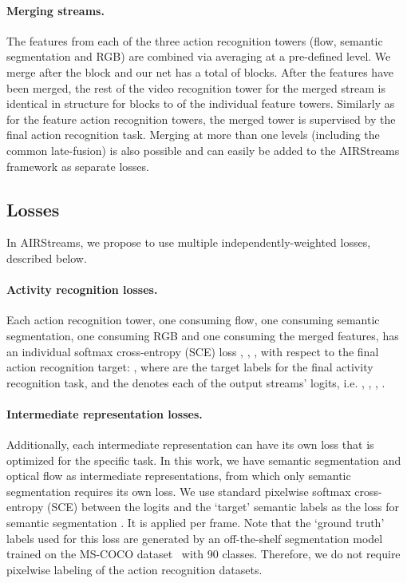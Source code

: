 \documentclass[final]{cvpr}
\begin{document}
\paragraph{Merging streams.} \label{sssection:merging}
The features from each of the three action recognition towers (flow, semantic segmentation and RGB) are combined via averaging at a pre-defined level. We merge after the  block and our net has a total of  blocks. After the features have been merged, the rest of the video recognition tower for the merged stream is identical in structure for blocks  to  of the individual feature towers. Similarly as for the feature action recognition towers, the merged tower is supervised by the final action recognition task.
Merging at more than one levels (including the common late-fusion) is also possible and can easily be added to the AIRStreams framework as separate losses.


\subsection{Losses} \label{ssection:losses}
\label{sec:losses}

In AIRStreams, we propose to use multiple independently-weighted losses, described below. 

\paragraph{Activity recognition losses.}
Each action recognition tower, one consuming flow, one consuming semantic segmentation, one consuming RGB and one consuming the merged features, has an individual softmax cross-entropy (SCE) loss , , ,  with respect to the final action recognition target:
, where  are the target labels for the final activity recognition task, and the  denotes each of the output streams' logits, i.e. , , , .


\paragraph{Intermediate representation losses.}
Additionally, each intermediate representation can have its own loss that is optimized for the specific task. In this work, we have semantic segmentation and optical flow as intermediate representations, from which only semantic segmentation requires its own loss. We use standard pixelwise softmax cross-entropy (SCE) between the logits  and the `target' semantic labels  as the loss for semantic segmentation . It is applied per frame. Note that the `ground truth' labels used for this loss are generated by an off-the-shelf segmentation model trained on the MS-COCO dataset~\cite{mscoco} with 90 classes. Therefore, we do not require pixelwise labeling of the action recognition datasets.
\end{document}
